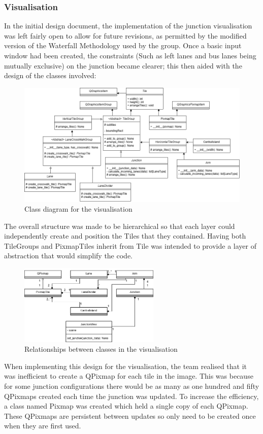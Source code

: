 \documentclass{article}
\begin{document}
    \subsubsection{Visualisation}
    In the initial design document, the implementation of the junction visualisation was left fairly open to allow for future revisions, as permitted by the
    modified version of the Waterfall Methodology used by the group. Once a basic input window had been created, the constraints (Such as left lanes and bus
    lanes being mutually exclusive) on the junction became clearer; this then aided with the design of the classes involved:
    \begin{figure}[H]
        \centering
        \includegraphics[width=\textwidth]{visualisation_class}
        \caption{Class diagram for the visualisation}
        \label{fig:visualisation_class}
    \end{figure}
    The overall structure was made to be hierarchical so that each layer could independently create and position the Tiles that they contained. Having both
    TileGroups and PixmapTiles inherit from Tile was intended to provide a layer of abstraction that would simplify the code.
    \begin{figure}[H]
        \centering
        \includegraphics[width=0.6\textwidth]{visualisation_relationship}
        \caption{Relationships between classes in the visualisation}
        \label{fig:visualisation_relationship}
    \end{figure}
    When implementing this design for the visualisation, the team realised that it was inefficient to create a QPixmap for each tile in the image. This
    was because for some junction configurations there would be as many as one hundred and fifty QPixmaps created each time the junction was updated. To
    increase the efficiency, a class named Pixmap was created which held a single copy of each QPixmap. These QPixmaps are persistent between updates so
    only need to be created once when they are first used.\\
\end{document}
